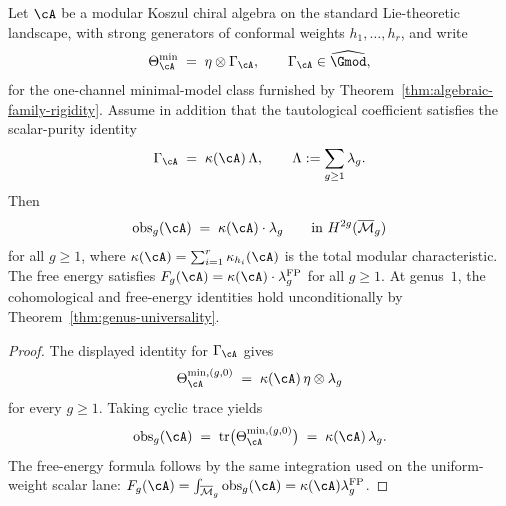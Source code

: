 \begin{theorem}
\label{thm:multi-generator-universality}
%
%
%
%
Let\/ $\cA$ be a modular Koszul chiral algebra on the standard
Lie-theoretic landscape, with strong generators of conformal
weights $h_1, \ldots, h_r$, and write
\[
\Theta_{\cA}^{\min}
\;=\;
\eta \otimes \Gamma_{\cA},
\qquad
\Gamma_{\cA} \in \widehat{\Gmod},
\]
for the one-channel minimal-model class furnished by
Theorem~\ref{thm:algebraic-family-rigidity}.  Assume in addition
that the tautological coefficient satisfies the scalar-purity
identity
\[
\Gamma_{\cA}
\;=\;
\kappa(\cA)\,\Lambda,
\qquad
\Lambda := \sum_{g \ge 1}\lambda_g.
\]
Then
\begin{equation}\label{eq:multi-generator-universality}
\mathrm{obs}_g(\cA) \;=\; \kappa(\cA) \cdot \lambda_g
\qquad \text{in } H^{2g}(\overline{\mathcal{M}}_g)
\end{equation}
for all\/ $g \geq 1$, where
$\kappa(\cA) = \sum_{i=1}^r \kappa_{h_i}(\cA)$
is the total modular characteristic.
The free energy satisfies\/
$F_g(\cA) = \kappa(\cA) \cdot \lambda_g^{\mathrm{FP}}$
for all\/ $g \geq 1$.
At genus~$1$, the cohomological and free-energy identities hold
unconditionally by Theorem~\ref{thm:genus-universality}.
\end{theorem}

\begin{proof}
The displayed identity for $\Gamma_{\cA}$ gives
\[
\Theta_{\cA}^{\min,(g,0)}
\;=\;
\kappa(\cA)\,\eta \otimes \lambda_g
\]
for every\/ $g \geq 1$.  Taking cyclic trace yields
\[
\mathrm{obs}_g(\cA)
\;=\;
\operatorname{tr}\bigl(\Theta_{\cA}^{\min,(g,0)}\bigr)
\;=\;
\kappa(\cA)\,\lambda_g.
\]
The free-energy formula follows by the same integration used on
the uniform-weight scalar lane:
$F_g(\cA)=\int_{\overline{\mathcal{M}}_g}
\mathrm{obs}_g(\cA)
=\kappa(\cA)\lambda_g^{\mathrm{FP}}$.
\end{proof}

